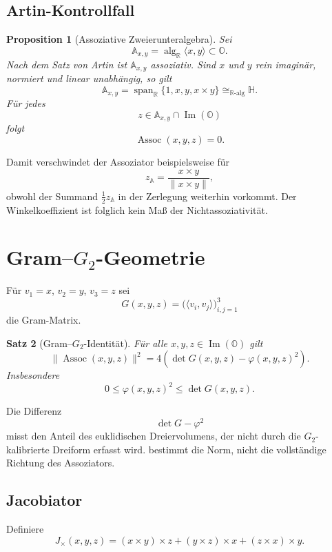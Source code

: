 \documentclass[11pt,a4paper]{article}
\newtheorem{theorem}{Satz}[section]
\newtheorem{proposition}[theorem]{Proposition}
\theoremstyle{definition}
\newcommand{\Oalg}{\mathbb O}
\newcommand{\ImO}{\operatorname{Im}(\mathbb O)}
\newcommand{\Assoc}{\operatorname{Assoc}}
\newcommand{\R}{\mathbb R}
\begin{document}
\subsection{Artin-Kontrollfall}

\begin{proposition}[Assoziative Zweierunteralgebra]
\label{prop:artin}
Sei
\[
\mathbb A_{x,y}
=
\operatorname{alg}_{\R}\langle x,y\rangle
\subset\Oalg.
\]
Nach dem Satz von Artin ist $\mathbb A_{x,y}$ assoziativ. Sind $x$ und $y$ rein imaginär, normiert und linear unabhängig, so gilt
\[
\mathbb A_{x,y}
=
\operatorname{span}_{\R}\{1,x,y,x\times y\}
\cong_{\R\text{-alg}}\mathbb H.
\]
Für jedes
\[
z\in\mathbb A_{x,y}\cap\ImO
\]
folgt
\[
\Assoc(x,y,z)=0.
\]
\end{proposition}

Damit verschwindet der Assoziator beispielsweise für
\[
z_{\mathbb A}
=
\frac{x\times y}{\|x\times y\|},
\]
obwohl der Summand $\tfrac12z_{\mathbb A}$ in der Zerlegung weiterhin vorkommt. Der Winkelkoeffizient ist folglich kein Maß der Nichtassoziativität.

\section{Gram--$G_2$-Geometrie}

Für $v_1=x$, $v_2=y$, $v_3=z$ sei
\[
G(x,y,z)
=
\bigl(\langle v_i,v_j\rangle\bigr)_{i,j=1}^{3}
\]
die Gram-Matrix.

\begin{theorem}[Gram--$G_2$-Identität]
\label{thm:gram-g2}
Für alle $x,y,z\in\ImO$ gilt
\begin{equation}
\|\Assoc(x,y,z)\|^2
=
4\left(
\det G(x,y,z)-\varphi(x,y,z)^2
\right).
\label{eq:gram-g2}
\end{equation}
Insbesondere
\[
0\leq \varphi(x,y,z)^2\leq \det G(x,y,z).
\]
\end{theorem}

Die Differenz
\[
\det G-\varphi^2
\]
misst den Anteil des euklidischen Dreiervolumens, der nicht durch die $G_2$-kalibrierte Dreiform erfasst wird.  bestimmt die Norm, nicht die vollständige Richtung des Assoziators.

\subsection{Jacobiator}

Definiere
\[
J_\times(x,y,z)
=
(x\times y)\times z
+(y\times z)\times x
+(z\times x)\times y.
\]
\end{document}
